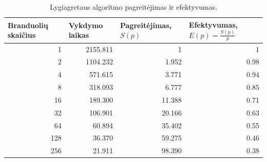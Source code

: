 \documentclass{VUMIFPSbakalaurinis}
\begin{document}
\begin{table}[]
    \begin{tabular}{|r|r|r|r|}
        \hline
        \multicolumn{1}{|l|}{Branduolių skaičius} & \multicolumn{1}{l|}{Vykdymo laikas} & \multicolumn{1}{l|}{Pagreitėjimas, $S(p)$} & \multicolumn{1}{l|}{Efektyvumas, $E(p)=\frac{S(p)}{p}$} \\ \hline
        1                                         & 2155.811                            & 1                                          & 1                                                       \\ \hline
        2                                         & 1104.232                            & 1.952                                      & 0.98                                                    \\ \hline
        4                                         & 571.615                             & 3.771                                      & 0.94                                                    \\ \hline
        8                                         & 318.093                             & 6.777                                      & 0.85                                                    \\ \hline
        16                                        & 189.300                             & 11.388                                     & 0.71                                                    \\ \hline
        32                                        & 106.901                             & 20.166                                     & 0.63                                                    \\ \hline
        64                                        & 60.894                              & 35.402                                     & 0.55                                                    \\ \hline
        128                                       & 36.370                              & 59.275                                     & 0.46                                                    \\ \hline
        256                                       & 21.911                              & 98.390                                     & 0.38                                                    \\ \hline
    \end{tabular}
    \caption{Lygiagretaus algoritmo pagreitėjimas ir efektyvumas. }
    \label{table:speedup}
\end{table}
\end{document}
